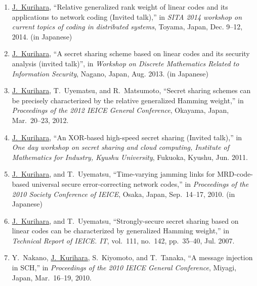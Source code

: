 \begin{enumerate}
 \item \underline{J.~Kurihara}, ``Relative generalized rank weight of linear codes and its applications to network coding (Invited talk),'' in \textit{SITA 2014 workshop on current topics of coding in distributed systems}, Toyama, Japan, Dec. 9--12, 2014. (in Japanese)
 \item \underline{J.~Kurihara}, ``A secret sharing scheme based on linear codes and its security analysis (invited talk)'', in \textit{Workshop on Discrete Mathematics Related to Information Security}, Nagano, Japan, Aug. 2013. (in Japanese)
 \item \underline{J.~Kurihara}, T.~Uyematsu, and R.~Matsumoto,
       ``Secret sharing schemes can be precisely
       characterized by the relative generalized Hamming weight,''
       in \textit{Proceedings of the 2012 IEICE General Conference},
       Okayama, Japan, Mar.~20--23, 2012.
 \item \underline{J.~Kurihara}, ``An XOR-based high-speed secret sharing (Invited talk),'' in \textit{One day workshop on secret sharing and cloud computing, Institute of Mathematics for Industry, Kyushu University}, Fukuoka, Kyushu, Jun. 2011.
 \item \underline{J.~Kurihara}, and T.~Uyematsu, ``Time-varying jamming links for MRD-code-based universal secure error-correcting network codes,'' in \textit{Proceedings of the 2010 Society Conference of IEICE}, Osaka, Japan, Sep.~14--17, 2010. (in Japanese)
 \item \underline{J.~Kurihara}, and T.~Uyematsu, ``Strongly-secure secret
       sharing based on linear codes can be characterized by generalized
       Hamming weight,'' in \textit{Technical Report of IEICE. IT},
       vol.~111, no.~142, pp.~35--40, Jul. 2007.
 \item Y.~Nakano, \underline{J.~Kurihara}, S.~Kiyomoto, and T.~Tanaka, ``A message injection in SCH,'' in \textit{Proceedings of the 2010 IEICE General Conference}, Miyagi, Japan, Mar.~16--19, 2010.


\end{enumerate}
